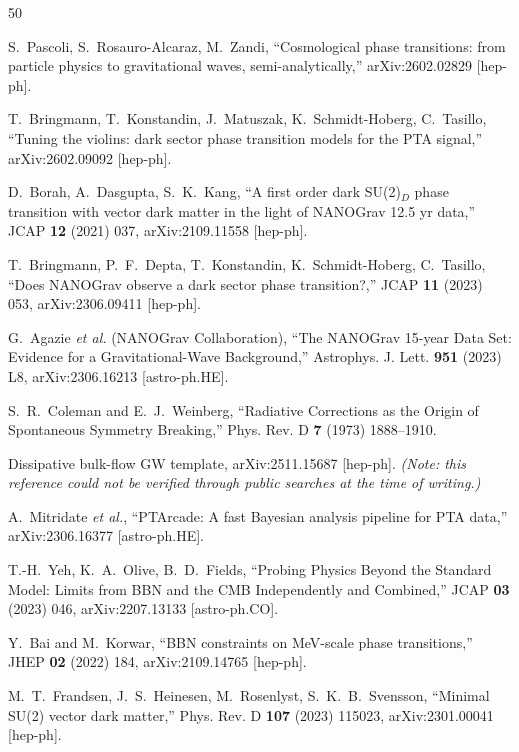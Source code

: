 \documentclass[12pt,a4paper]{article}
\begin{document}
\begin{thebibliography}{50}

S.~Pascoli, S.~Rosauro-Alcaraz, M.~Zandi,
``Cosmological phase transitions: from particle physics to gravitational waves, semi-analytically,''
arXiv:2602.02829 [hep-ph].

T.~Bringmann, T.~Konstandin, J.~Matuszak, K.~Schmidt-Hoberg, C.~Tasillo,
``Tuning the violins: dark sector phase transition models for the PTA signal,''
arXiv:2602.09092 [hep-ph].

D.~Borah, A.~Dasgupta, S.~K.~Kang,
``A first order dark SU(2)$_D$ phase transition with vector dark matter in the light of NANOGrav 12.5 yr data,''
JCAP \textbf{12} (2021) 037, arXiv:2109.11558 [hep-ph].

T.~Bringmann, P.~F.~Depta, T.~Konstandin, K.~Schmidt-Hoberg, C.~Tasillo,
``Does NANOGrav observe a dark sector phase transition?,''
JCAP \textbf{11} (2023) 053, arXiv:2306.09411 [hep-ph].

G.~Agazie \textit{et al.} (NANOGrav Collaboration),
``The NANOGrav 15-year Data Set: Evidence for a Gravitational-Wave Background,''
Astrophys. J. Lett. \textbf{951} (2023) L8, arXiv:2306.16213 [astro-ph.HE].

S.~R.~Coleman and E.~J.~Weinberg,
``Radiative Corrections as the Origin of Spontaneous Symmetry Breaking,''
Phys. Rev. D \textbf{7} (1973) 1888--1910.

Dissipative bulk-flow GW template,
arXiv:2511.15687 [hep-ph].
\textit{(Note: this reference could not be verified through public searches at the time of writing.)}

A.~Mitridate \textit{et al.},
``PTArcade: A fast Bayesian analysis pipeline for PTA data,''
arXiv:2306.16377 [astro-ph.HE].

T.-H.~Yeh, K.~A.~Olive, B.~D.~Fields,
``Probing Physics Beyond the Standard Model: Limits from BBN and the CMB Independently and Combined,''
JCAP \textbf{03} (2023) 046, arXiv:2207.13133 [astro-ph.CO].

Y.~Bai and M.~Korwar,
``BBN constraints on MeV-scale phase transitions,''
JHEP \textbf{02} (2022) 184, arXiv:2109.14765 [hep-ph].

M.~T.~Frandsen, J.~S.~Heinesen, M.~Rosenlyst, S.~K.~B.~Svensson,
``Minimal SU(2) vector dark matter,''
Phys. Rev. D \textbf{107} (2023) 115023, arXiv:2301.00041 [hep-ph].


\end{thebibliography}
\end{document}

